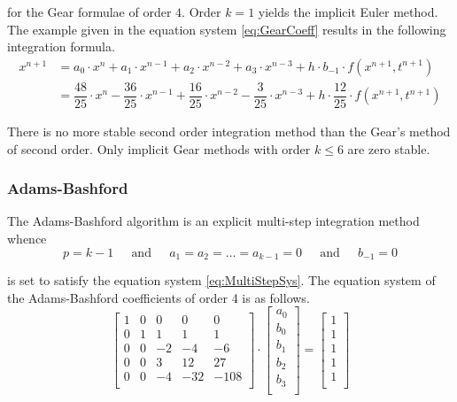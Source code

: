 for the Gear formulae of order $4$.  Order $k = 1$ yields the implicit
Euler method.  The example given in the equation system
\eqref{eq:GearCoeff} results in the following integration formula.
\begin{equation}
\label{eq:GearInt}
\begin{split}
x^{n+1} &= a_0\cdot x^{n} + a_1\cdot x^{n-1} + a_2\cdot x^{n-2} + a_3\cdot x^{n-3} + h\cdot b_{-1}\cdot f(x^{n+1}, t^{n+1})\\
&= \dfrac{48}{25}\cdot x^{n} - \dfrac{36}{25}\cdot x^{n-1} + \dfrac{16}{25}\cdot x^{n-2} - \dfrac{3}{25}\cdot x^{n-3} + h\cdot \dfrac{12}{25}\cdot f(x^{n+1}, t^{n+1})
\end{split}
\end{equation}

There is no more stable second order integration method than the
Gear's method of second order.  Only implicit Gear methods with order
$k \le 6$ are zero stable.

\subsubsection{Adams-Bashford}

The Adams-Bashford algorithm is an explicit multi-step integration
method whence
\begin{equation}
p = k - 1
\;\;\;\; \textrm{ and } \;\;\;\;
a_1 = a_2 = \ldots = a_{k-1} = 0
\;\;\;\; \textrm{ and } \;\;\;\;
b_{-1} = 0
\end{equation}

is set to satisfy the equation system \eqref{eq:MultiStepSys}.  The
equation system of the Adams-Bashford coefficients of order 4 is as
follows.
\begin{equation}
\left[\begin{array}{lrrrr}
1 & 0 &  0 &   0 &    0\\
0 & 1 &  1 &   1 &    1\\
0 & 0 & -2 &  -4 &   -6\\
0 & 0 &  3 &  12 &   27\\
0 & 0 & -4 & -32 & -108\\
\end{array}\right]
\cdot
\begin{bmatrix}
a_0\\
b_0\\
b_1\\
b_2\\
b_3\\
\end{bmatrix}
=
\begin{bmatrix}
1\\
1\\
1\\
1\\
1\\
\end{bmatrix}
\end{equation}

